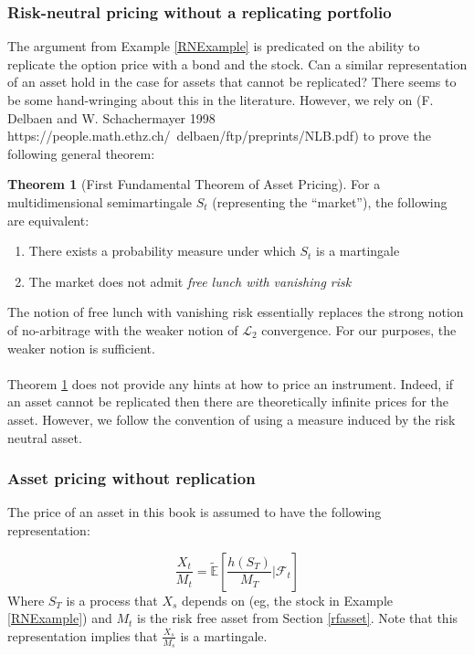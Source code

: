 \documentclass{article}
\theoremstyle{definition}
\newtheorem{theorem}{Theorem}
\begin{document}
\subsubsection{Risk-neutral pricing without a replicating portfolio}

The argument from Example \ref{RNExample} is predicated on the ability to replicate the option price with a bond and the stock.  Can a similar representation of an asset hold in the case for assets that cannot be replicated?  There seems to be some hand-wringing about this in the literature.  However, we rely on (F. Delbaen and W. Schachermayer 1998 https://people.math.ethz.ch/~delbaen/ftp/preprints/NLB.pdf) to prove the following general theorem:

\begin{theorem}[First Fundamental Theorem of Asset Pricing] \label{FFTAP}
	For a multidimensional semimartingale \(S_t\) (representing the ``market''), the following are equivalent:
	\begin{enumerate}
		\item There exists a probability measure under which \(S_t\) is a martingale
		\item The market does not admit \emph{free lunch with vanishing risk}
	\end{enumerate}
\end{theorem}

The notion of free lunch with vanishing risk essentially replaces the strong notion of no-arbitrage with the weaker notion of \(\mathcal{L}_2\) convergence.  For our purposes, the weaker notion is sufficient. 
\\
\\
Theorem \ref{FFTAP} does not provide any hints at how to price an instrument.  Indeed, if an asset cannot be replicated then there are theoretically infinite prices for the asset.  However, we follow the convention of using a measure induced by the risk neutral asset.

\subsubsection{Asset pricing without replication}

The price of an asset in this book is assumed to have the following representation:

\[\frac{X_t}{M_t}=\mathbb{\tilde{E}}\left[\frac{h(S_T)}{M_T}|\mathcal{F}_t\right]\]
Where \(S_T\) is a process that \(X_s\) depends on (eg, the stock in Example \ref{RNExample}) and \(M_t\) is the risk free asset from Section \ref{rfasset}.  Note that this representation implies that \(\frac{X_s}{M_s}\) is a martingale.  
\end{document}
